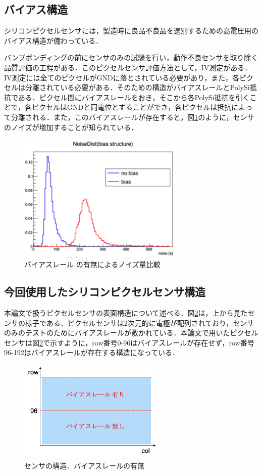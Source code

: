\subsection{バイアス構造}
シリコンピクセルセンサには，製造時に良品不良品を選別するための高電圧用のバイアス構造が備わっている．\par
バンプボンディングの前にセンサのみの試験を行い，動作不良センサを取り除く品質評価の工程がある．このピクセルセンサ評価方法として，IV測定がある．IV測定には全てのピクセルがGNDに落とされている必要があり，また，各ピクセルは分離されている必要がある．そのための構造がバイアスレールとPolySi抵抗である．ピクセル間にバイアスレールをおき，そこから各PolySi抵抗を引くことで，各ピクセルはGNDと同電位とすることができ，各ピクセルは抵抗によって分離される．また，このバイアスレールが存在すると，図\ref{fig:bias}のように，センサのノイズが増加することが知られている．
\begin{figure}[h]
  \centering
  \includegraphics[width=8cm]{./figure/noisedist.png}
  \caption{バイアスレール の有無によるノイズ量比較\cite{uchiyama}}
  \label{fig:bias}
\end{figure}

\subsection{今回使用したシリコンピクセルセンサ構造}
本論文で扱うピクセルセンサの表面構造について述べる．図\ref{fig:sensor}は，上から見たセンサの様子である．ピクセルセンサは2次元的に電極が配列されており，センサのみのテストのためにバイアスレールが敷かれている．本論文で用いたピクセルセンサは図\ref{fig:sensor}で示すように，row番号0-96はバイアスレールが存在せず，row番号96-192はバイアスレールが存在する構造になっている．

\begin{figure}[h]
  \centering
  \includegraphics[width=7cm]{./figure/sensor.png}
  \caption{センサの構造．バイアスレールの有無}
  \label{fig:sensor}
\end{figure}


